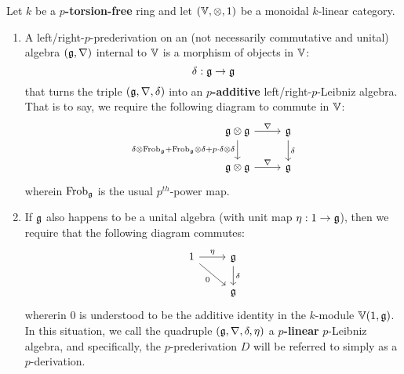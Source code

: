         \begin{definition} \label{def: arithmetic_leibniz_algebras}
            Let $k$ be a \textbf{$p$-torsion-free} ring and let $(\V, \tensor, 1)$ be a monoidal $k$-linear category. 
                \begin{enumerate}
                    \item A left/right-$p$-prederivation on an (not necessarily commutative and unital) algebra $\left(\mathfrak{g}, \nabla\right)$ internal to $\mathbb{V}$ is a morphism of objects in $\mathbb{V}$:
                        $$\delta: \mathfrak{g} \to \mathfrak{g}$$
                    that turns the triple $\left(\mathfrak{g}, \nabla, \delta\right)$ into an \textbf{$p$-additive} left/right-$p$-Leibniz algebra. That is to say, we require the following diagram to commute in $\mathbb{V}$:
                        $$
                            \begin{tikzcd}
                            	{\g \tensor \g} & {\g} \\
                            	{\g \tensor \g} & {\g}
                            	\arrow["{\delta}", from=1-2, to=2-2]
                            	\arrow["{\nabla}", from=2-1, to=2-2]
                            	\arrow["{\nabla}", from=1-1, to=1-2]
                            	\arrow["{\delta \tensor \Frob_{\g} + \Frob_{\g} \tensor \delta + p \cdot \delta \tensor \delta}"', from=1-1, to=2-1]
                            \end{tikzcd}
                        $$
                    wherein $\mathrm{Frob}_{\mathfrak{g}}$ is the usual $p^{th}$-power map.
                    \item If $\mathfrak{g}$ also happens to be a unital algebra (with unit map $\eta: 1 \to \mathfrak{g}$), then we require that the following diagram commutes:
                        $$
                            \begin{tikzcd}
                            	{1} & {\g} \\
                            	& {\g}
                            	\arrow["{\delta}", from=1-2, to=2-2]
                            	\arrow["{\eta}", from=1-1, to=1-2]
                            	\arrow["{0}"', from=1-1, to=2-2]
                            \end{tikzcd}
                        $$
                    whererin $0$ is understood to be the additive identity in the $k$-module $\mathbb{V}(1, \mathfrak{g})$. In this situation, we call the quadruple $(\mathfrak{g}, \nabla, \delta, \eta)$ a \textbf{$p$-linear} $p$-Leibniz algebra, and specifically, the $p$-prederivation $D$ will be referred to simply as a $p$-derivation.
                \end{enumerate}
        \end{definition}
